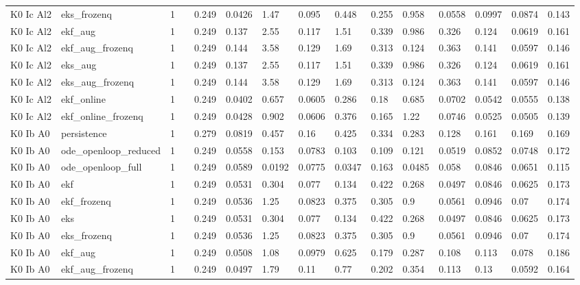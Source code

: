 \begin{table}[t]
\begin{tabular}{lllllllllllllll}
K0 Ic Al2 & eks\_frozenq & 1 &  & 0.249 & 0.0426 & 1.47 & 0.095 & 0.448 & 0.255 & 0.958 & 0.0558 & 0.0997 & 0.0874 & 0.143 \\
K0 Ic Al2 & ekf\_aug & 1 &  & 0.249 & 0.137 & 2.55 & 0.117 & 1.51 & 0.339 & 0.986 & 0.326 & 0.124 & 0.0619 & 0.161 \\
K0 Ic Al2 & ekf\_aug\_frozenq & 1 &  & 0.249 & 0.144 & 3.58 & 0.129 & 1.69 & 0.313 & 0.124 & 0.363 & 0.141 & 0.0597 & 0.146 \\
K0 Ic Al2 & eks\_aug & 1 &  & 0.249 & 0.137 & 2.55 & 0.117 & 1.51 & 0.339 & 0.986 & 0.326 & 0.124 & 0.0619 & 0.161 \\
K0 Ic Al2 & eks\_aug\_frozenq & 1 &  & 0.249 & 0.144 & 3.58 & 0.129 & 1.69 & 0.313 & 0.124 & 0.363 & 0.141 & 0.0597 & 0.146 \\
K0 Ic Al2 & ekf\_online & 1 &  & 0.249 & 0.0402 & 0.657 & 0.0605 & 0.286 & 0.18 & 0.685 & 0.0702 & 0.0542 & 0.0555 & 0.138 \\
K0 Ic Al2 & ekf\_online\_frozenq & 1 &  & 0.249 & 0.0428 & 0.902 & 0.0606 & 0.376 & 0.165 & 1.22 & 0.0746 & 0.0525 & 0.0505 & 0.139 \\
K0 Ib A0 & persistence & 1 &  & 0.279 & 0.0819 & 0.457 & 0.16 & 0.425 & 0.334 & 0.283 & 0.128 & 0.161 & 0.169 & 0.169 \\
K0 Ib A0 & ode\_openloop\_reduced & 1 &  & 0.249 & 0.0558 & 0.153 & 0.0783 & 0.103 & 0.109 & 0.121 & 0.0519 & 0.0852 & 0.0748 & 0.172 \\
K0 Ib A0 & ode\_openloop\_full & 1 &  & 0.249 & 0.0589 & 0.0192 & 0.0775 & 0.0347 & 0.163 & 0.0485 & 0.058 & 0.0846 & 0.0651 & 0.115 \\
K0 Ib A0 & ekf & 1 &  & 0.249 & 0.0531 & 0.304 & 0.077 & 0.134 & 0.422 & 0.268 & 0.0497 & 0.0846 & 0.0625 & 0.173 \\
K0 Ib A0 & ekf\_frozenq & 1 &  & 0.249 & 0.0536 & 1.25 & 0.0823 & 0.375 & 0.305 & 0.9 & 0.0561 & 0.0946 & 0.07 & 0.174 \\
K0 Ib A0 & eks & 1 &  & 0.249 & 0.0531 & 0.304 & 0.077 & 0.134 & 0.422 & 0.268 & 0.0497 & 0.0846 & 0.0625 & 0.173 \\
K0 Ib A0 & eks\_frozenq & 1 &  & 0.249 & 0.0536 & 1.25 & 0.0823 & 0.375 & 0.305 & 0.9 & 0.0561 & 0.0946 & 0.07 & 0.174 \\
K0 Ib A0 & ekf\_aug & 1 &  & 0.249 & 0.0508 & 1.08 & 0.0979 & 0.625 & 0.179 & 0.287 & 0.108 & 0.113 & 0.078 & 0.186 \\
K0 Ib A0 & ekf\_aug\_frozenq & 1 &  & 0.249 & 0.0497 & 1.79 & 0.11 & 0.77 & 0.202 & 0.354 & 0.113 & 0.13 & 0.0592 & 0.164 \\

\end{tabular}
\end{table}
